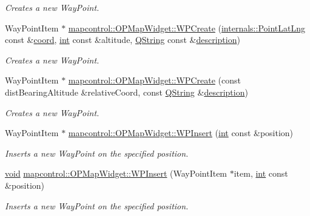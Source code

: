 \begin{DoxyCompactItemize}
\begin{DoxyCompactList}\small\item\em Creates a new Way\-Point. \end{DoxyCompactList}\item 
Way\-Point\-Item $\ast$ \hyperlink{group___o_p_map_widget_gae95af6f438774b8cddf4b8b4d670483c}{mapcontrol\-::\-O\-P\-Map\-Widget\-::\-W\-P\-Create} (\hyperlink{structinternals_1_1_point_lat_lng}{internals\-::\-Point\-Lat\-Lng} const \&\hyperlink{glext_8h_a4ad6f000813afde2b5727cbfdddc75be}{coord}, \hyperlink{ioapi_8h_a787fa3cf048117ba7123753c1e74fcd6}{int} const \&altitude, \hyperlink{group___u_a_v_objects_plugin_gab9d252f49c333c94a72f97ce3105a32d}{Q\-String} const \&\hyperlink{sdlgamepad_8dox_ae82208d022e4246ddf1e4f481a3f81b0}{description})
\begin{DoxyCompactList}\small\item\em Creates a new Way\-Point. \end{DoxyCompactList}\item 
Way\-Point\-Item $\ast$ \hyperlink{group___o_p_map_widget_ga950bec7a5d536f5adeddf3f2db2ee98f}{mapcontrol\-::\-O\-P\-Map\-Widget\-::\-W\-P\-Create} (const dist\-Bearing\-Altitude \&relative\-Coord, const \hyperlink{group___u_a_v_objects_plugin_gab9d252f49c333c94a72f97ce3105a32d}{Q\-String} \&\hyperlink{sdlgamepad_8dox_ae82208d022e4246ddf1e4f481a3f81b0}{description})
\begin{DoxyCompactList}\small\item\em Creates a new Way\-Point. \end{DoxyCompactList}\item 
Way\-Point\-Item $\ast$ \hyperlink{group___o_p_map_widget_ga44d46fc77045a7ac6011ebda19204c43}{mapcontrol\-::\-O\-P\-Map\-Widget\-::\-W\-P\-Insert} (\hyperlink{ioapi_8h_a787fa3cf048117ba7123753c1e74fcd6}{int} const \&position)
\begin{DoxyCompactList}\small\item\em Inserts a new Way\-Point on the specified position. \end{DoxyCompactList}\item 
\hyperlink{group___u_a_v_objects_plugin_ga444cf2ff3f0ecbe028adce838d373f5c}{void} \hyperlink{group___o_p_map_widget_ga65a6a571d08fec807a20945e293acc73}{mapcontrol\-::\-O\-P\-Map\-Widget\-::\-W\-P\-Insert} (Way\-Point\-Item $\ast$item, \hyperlink{ioapi_8h_a787fa3cf048117ba7123753c1e74fcd6}{int} const \&position)
\begin{DoxyCompactList}\small\item\em Inserts a new Way\-Point on the specified position. \end{DoxyCompactList}\item 

\end{DoxyCompactItemize}
